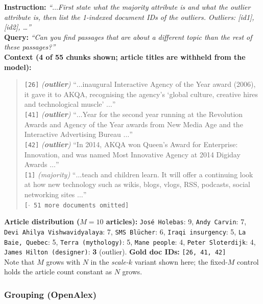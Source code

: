 \textbf{Instruction:} \emph{``$\dots$First state what the majority attribute is and what the outlier
attribute is, then list the 1-indexed document IDs of the outliers. Outliers: [id1], [id2], \dots''}\\
\textbf{Query:} \emph{``Can you find passages that are about a different topic than the rest of these
passages?''}\\
\textbf{Context (4 of 55 chunks shown; article titles are withheld from the model):}
\begin{quote}\small
\texttt{[26]} \emph{(\textbf{outlier})} ``$\dots$inaugural Interactive Agency of the Year award
(2006), it gave it to AKQA, recognising the agency's `global culture, creative hires and
technological muscle' $\dots$''\\
\texttt{[41]} \emph{(\textbf{outlier})} ``$\dots$Year for the second year running at the Revolution
Awards and Agency of the Year awards from New Media Age and the Interactive Advertising Bureau
$\dots$''\\
\texttt{[42]} \emph{(\textbf{outlier})} ``In 2014, AKQA won Queen's Award for Enterprise: Innovation,
and was named Most Innovative Agency at 2014 Digiday Awards $\dots$''\\
\texttt{[1]} \emph{(majority)} ``$\dots$teach and children learn. It will offer a continuing look at
how new technology such as wikis, blogs, vlogs, RSS, podcasts, social networking sites $\dots$''\\
\texttt{[$\cdot$ 51 more documents omitted]}
\end{quote}
\textbf{Article distribution ($M{=}10$ articles):} \texttt{Jos\'e Holebas}: 9, \texttt{Andy Carvin}:
7, \texttt{Devi Ahilya Vishwavidyalaya}: 7, \texttt{SMS Bl\"ucher}: 6, \texttt{Iraqi insurgency}: 5,
\texttt{La Baie, Quebec}: 5, \texttt{Terra (mythology)}: 5, \texttt{Mane people}: 4, \texttt{Peter
Sloterdijk}: 4, \texttt{James Hilton (designer)}: \textbf{3} (outlier).\quad
\textbf{Gold doc IDs:} \texttt{[26, 41, 42]}\\
Note that $M$ grows with $N$ in the \emph{scale-$k$} variant shown here; the fixed-$M$ control holds
the article count constant as $N$ grows.

\subsubsection{Grouping (OpenAlex)}

